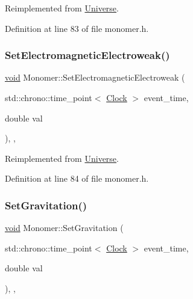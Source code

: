 Reimplemented from \mbox{\hyperlink{class_universe_aa981fc7e252b1fbbb675f0371860954d}{Universe}}.



Definition at line 83 of file monomer.\+h.

\mbox{\label{class_monomer_aa034728b74053ed3df452ddc8f1b46e8}} 
\subsubsection{\texorpdfstring{Set\+Electromagnetic\+Electroweak()}{SetElectromagneticElectroweak()}}
{\footnotesize\ttfamily \mbox{\hyperlink{glad_8h_a950fc91edb4504f62f1c577bf4727c29}{void}} Monomer\+::\+Set\+Electromagnetic\+Electroweak (\begin{DoxyParamCaption}\item[{std\+::chrono\+::time\+\_\+point$<$ \mbox{\hyperlink{universe_8h_a0ef8d951d1ca5ab3cfaf7ab4c7a6fd80}{Clock}} $>$}]{event\+\_\+time,  }\item[{double}]{val }\end{DoxyParamCaption})\hspace{0.3cm}{\ttfamily [inline]}, {\ttfamily [final]}, {\ttfamily [virtual]}}



Reimplemented from \mbox{\hyperlink{class_universe_a608aa95698380f791a0ffba45cc1bee3}{Universe}}.



Definition at line 84 of file monomer.\+h.

\mbox{\label{class_monomer_ab38d44b27a46d5630aeb5e889f927c09}} 
\subsubsection{\texorpdfstring{Set\+Gravitation()}{SetGravitation()}}
{\footnotesize\ttfamily \mbox{\hyperlink{glad_8h_a950fc91edb4504f62f1c577bf4727c29}{void}} Monomer\+::\+Set\+Gravitation (\begin{DoxyParamCaption}\item[{std\+::chrono\+::time\+\_\+point$<$ \mbox{\hyperlink{universe_8h_a0ef8d951d1ca5ab3cfaf7ab4c7a6fd80}{Clock}} $>$}]{event\+\_\+time,  }\item[{double}]{val }\end{DoxyParamCaption})\hspace{0.3cm}{\ttfamily [inline]}, {\ttfamily [final]}, {\ttfamily [virtual]}}



